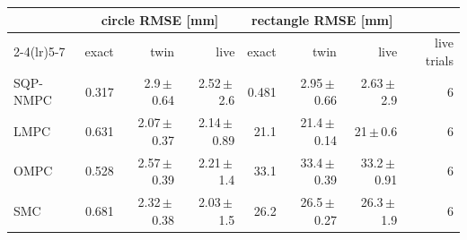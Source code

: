 \begin{tabular}{lrrrrrrr}
\toprule
 & \multicolumn{3}{c}{circle RMSE [mm]} & \multicolumn{3}{c}{rectangle RMSE [mm]} & \\
\cmidrule(lr){2-4}\cmidrule(lr){5-7}
 & exact & twin & live & exact & twin & live & live trials \\
\midrule
SQP-NMPC & 0.317 & 2.9\,$\pm$\,0.64 & 2.52\,$\pm$\,2.6 & 0.481 & 2.95\,$\pm$\,0.66 & 2.63\,$\pm$\,2.9 & 6 \\
LMPC & 0.631 & 2.07\,$\pm$\,0.37 & 2.14\,$\pm$\,0.89 & 21.1 & 21.4\,$\pm$\,0.14 & 21\,$\pm$\,0.6 & 6 \\
OMPC & 0.528 & 2.57\,$\pm$\,0.39 & 2.21\,$\pm$\,1.4 & 33.1 & 33.4\,$\pm$\,0.39 & 33.2\,$\pm$\,0.91 & 6 \\
SMC & 0.681 & 2.32\,$\pm$\,0.38 & 2.03\,$\pm$\,1.5 & 26.2 & 26.5\,$\pm$\,0.27 & 26.3\,$\pm$\,1.9 & 6 \\
\bottomrule
\end{tabular}
